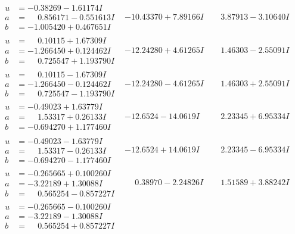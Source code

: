\documentclass[1p]{elsarticle_modified}
\theoremstyle{definition}
\begin{document}
$$\begin{array}{c|c|c}
\begin{aligned}
u &= -0.38269 - 1.61174 I \\
a &= \phantom{-}0.856171 - 0.551613 I \\
b &= -1.005420 + 0.467651 I\end{aligned}
 & -10.43370 + 7.89166 I & \phantom{-}3.87913 - 3.10640 I \\ \hline\begin{aligned}
u &= \phantom{-}0.10115 + 1.67309 I \\
a &= -1.266450 + 0.124462 I \\
b &= \phantom{-}0.725547 + 1.193790 I\end{aligned}
 & -12.24280 + 4.61265 I & \phantom{-}1.46303 - 2.55091 I \\ \hline\begin{aligned}
u &= \phantom{-}0.10115 - 1.67309 I \\
a &= -1.266450 - 0.124462 I \\
b &= \phantom{-}0.725547 - 1.193790 I\end{aligned}
 & -12.24280 - 4.61265 I & \phantom{-}1.46303 + 2.55091 I \\ \hline\begin{aligned}
u &= -0.49023 + 1.63779 I \\
a &= \phantom{-}1.53317 + 0.26133 I \\
b &= -0.694270 + 1.177460 I\end{aligned}
 & -12.6524 - 14.0619 I & \phantom{-}2.23345 + 6.95334 I \\ \hline\begin{aligned}
u &= -0.49023 - 1.63779 I \\
a &= \phantom{-}1.53317 - 0.26133 I \\
b &= -0.694270 - 1.177460 I\end{aligned}
 & -12.6524 + 14.0619 I & \phantom{-}2.23345 - 6.95334 I \\ \hline\begin{aligned}
u &= -0.265665 + 0.100260 I \\
a &= -3.22189 + 1.30088 I \\
b &= \phantom{-}0.565254 - 0.857227 I\end{aligned}
 & \phantom{-}0.38970 - 2.24826 I & \phantom{-}1.51589 + 3.88242 I \\ \hline\begin{aligned}
u &= -0.265665 - 0.100260 I \\
a &= -3.22189 - 1.30088 I \\
b &= \phantom{-}0.565254 + 0.857227 I\end{aligned}

\end{array}$$
\end{document}
